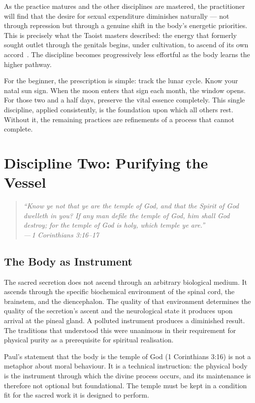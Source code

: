 \documentclass[12pt, a4paper]{article}
\newcommand{\epigraph}[2]{%
  \begin{quote}
    \itshape ``#1''\\[0.3em]
    \normalfont\small\hfill ---\,#2
  \end{quote}
}
\begin{document}
As the practice matures and the other disciplines are mastered, the
practitioner will find that the desire for sexual expenditure diminishes
naturally — not through repression but through a genuine shift in the body's
energetic priorities. This is precisely what the Taoist masters described: the
energy that formerly sought outlet through the genitals begins, under
cultivation, to ascend of its own accord~\autocite{chia2002}. The discipline
becomes progressively less effortful as the body learns the higher pathway.

For the beginner, the prescription is simple: track the lunar cycle. Know your
natal sun sign. When the moon enters that sign each month, the window opens.
For those two and a half days, preserve the vital essence completely. This
single discipline, applied consistently, is the foundation upon which all
others rest. Without it, the remaining practices are refinements of a process
that cannot complete.

\section{Discipline Two: Purifying the Vessel}
\label{sec:vessel}

\epigraph{Know ye not that ye are the temple of God, and that the Spirit of
God dwelleth in you? If any man defile the temple of God, him shall God
destroy; for the temple of God is holy, which temple ye are.}{1 Corinthians
3:16--17}

\subsection{The Body as Instrument}

The sacred secretion does not ascend through an arbitrary biological medium.
It ascends through the specific biochemical environment of the spinal cord,
the brainstem, and the diencephalon. The quality of that environment
determines the quality of the secretion's ascent and the neurological state
it produces upon arrival at the pineal gland. A polluted instrument produces
a diminished result. The traditions that understood this were unanimous in
their requirement for physical purity as a prerequisite for spiritual
realisation.

Paul's statement that the body is the temple of God (1 Corinthians 3:16) is
not a metaphor about moral behaviour. It is a technical instruction: the
physical body is the instrument through which the divine process occurs, and
its maintenance is therefore not optional but foundational. The temple must
be kept in a condition fit for the sacred work it is designed to perform.
\end{document}

